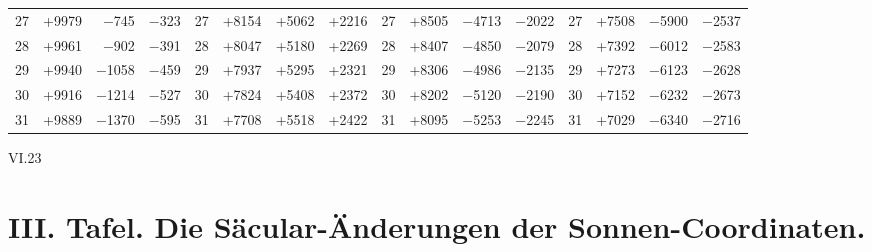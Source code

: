 \documentclass[10pt,a4paper]{article}
\begin{document}
\begin{center}
\begin{longtable}{@{}rrrrrrrrrrrrrrrr@{}}
27 & +9979 & $-$745 & $-$323 & 27 & +8154 & +5062 & +2216 & 27 & +8505 & $-$4713 & $-$2022 & 27 & +7508 & $-$5900 & $-$2537 \\
28 & +9961 & $-$902 & $-$391 & 28 & +8047 & +5180 & +2269 & 28 & +8407 & $-$4850 & $-$2079 & 28 & +7392 & $-$6012 & $-$2583 \\
29 & +9940 & $-$1058 & $-$459 & 29 & +7937 & +5295 & +2321 & 29 & +8306 & $-$4986 & $-$2135 & 29 & +7273 & $-$6123 & $-$2628 \\
30 & +9916 & $-$1214 & $-$527 & 30 & +7824 & +5408 & +2372 & 30 & +8202 & $-$5120 & $-$2190 & 30 & +7152 & $-$6232 & $-$2673 \\
31 & +9889 & $-$1370 & $-$595 & 31 & +7708 & +5518 & +2422 & 31 & +8095 & $-$5253 & $-$2245 & 31 & +7029 & $-$6340 & $-$2716 \\
\end{longtable}
\end{center}

\vspace{1em}
\noindent\textsc{VI.}\hfill 23

\clearpage
\section*{III. Tafel. Die Säcular-Änderungen der Sonnen-Coordinaten.}
\end{document}
